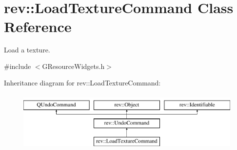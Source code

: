\hypertarget{classrev_1_1_load_texture_command}{}\section{rev\+::Load\+Texture\+Command Class Reference}
\label{classrev_1_1_load_texture_command}


Load a texture.  




{\ttfamily \#include $<$G\+Resource\+Widgets.\+h$>$}

Inheritance diagram for rev\+::Load\+Texture\+Command\+:\begin{figure}[H]
\begin{center}
\leavevmode
\includegraphics[height=3.000000cm]{classrev_1_1_load_texture_command}
\end{center}
\end{figure}
